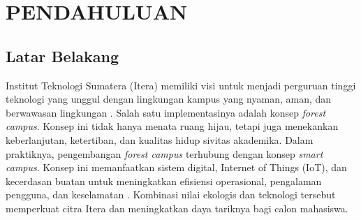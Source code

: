\chapter{PENDAHULUAN}

\section{Latar Belakang}
\label{section:latarbelakang}

Institut Teknologi Sumatera (Itera) memiliki visi untuk menjadi perguruan
tinggi teknologi yang unggul dengan lingkungan kampus yang nyaman, aman, dan
berwawasan lingkungan \cite{itera2019renstra}. Salah satu implementasinya
adalah konsep \textit{forest campus}. Konsep ini tidak hanya menata ruang
hijau, tetapi juga menekankan keberlanjutan, ketertiban, dan kualitas hidup
sivitas akademika. Dalam praktiknya, pengembangan \textit{forest campus}
terhubung dengan konsep \textit{smart campus}. Konsep ini memanfaatkan sistem
digital, Internet of Things (IoT), dan kecerdasan buatan untuk meningkatkan
efisiensi operasional, pengalaman pengguna, dan keselamatan
\cite{Polin2023SmartCampus}. Kombinasi nilai ekologis dan teknologi tersebut
memperkuat citra Itera dan meningkatkan daya tariknya bagi calon mahasiswa.

